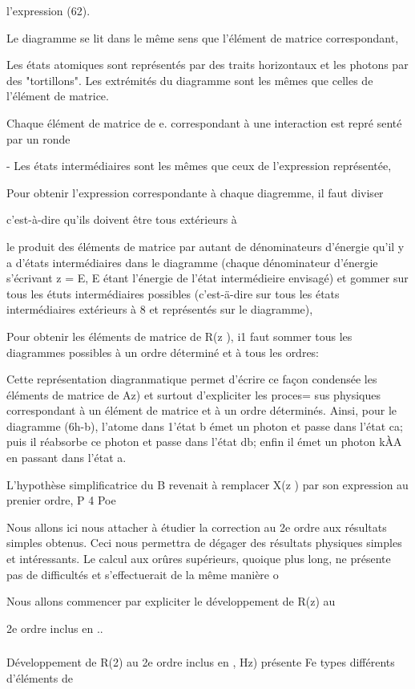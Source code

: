 l'expression (62).

Le diagramme se lit dans le même sens que l'élément de matrice correspondant,

Les états atomiques sont représentés par des traits horizontaux et les photons
par des "tortillons".
Les extrémités du diagramme sont les mêmes que celles de l'élément de matrice.

Chaque élément de matrice de e. correspondant à une interaction est repré
senté par un ronde

- Les états intermédiaires sont les mêmes que ceux de l'expression représentée,

Pour obtenir l'expression correspondante à chaque diagremme, il faut diviser

c'est-à-dire qu'ils doivent être tous extérieurs à

le produit des éléments de matrice par autant de dénominateurs d'énergie qu'il
y a d'états intermédiaires dans le diagramme (chaque dénominateur d'énergie
s'écrivant z = E, E étant l'énergie de l'état intermédieire envisagé) et
gommer sur tous les étuts intermédiaires possibles (c'est-ä-dire sur tous les
états intermédiaires extérieurs à 8 et représentés sur le diagramme),

Pour obtenir les éléments de matrice de R(z ), i1 faut sommer
tous les diagrammes possibles à un ordre déterminé et à tous les ordres:

Cette représentation diagranmatique permet d'écrire ce façon
condensée les éléments de matrice de Az) et surtout d'expliciter les proces=
sus physiques correspondant à un élément de matrice et à un ordre déterminés.
Ainsi, pour le diagramme (6h-b), l'atome dans 1'état b émet un photon
et passe dans l'état ca; puis il réabsorbe ce photon et passe dans l'état
db; enfin il émet un photon kÀA en passant dans l'état a.

L'hypothèse simplificatrice du  B revenait à remplacer X(z )
par son expression au prenier ordre, P 4 Poe

Nous allons ici nous attacher à étudier la correction au 2e
ordre aux résultats simples obtenus. Ceci nous permettra de dégager des résultats physiques simples et intéressants. Le calcul aux orûres supérieurs, quoique
plus long, ne présente pas de difficultés et s'effectuerait de la même manière o

Nous allons commencer par expliciter le développement de R(z) au

2e ordre inclus en ..

\subsubsection{} Développement de R(2) au 2e ordre inclus en ,%
Hz) présente Fe types différents d'éléments de


